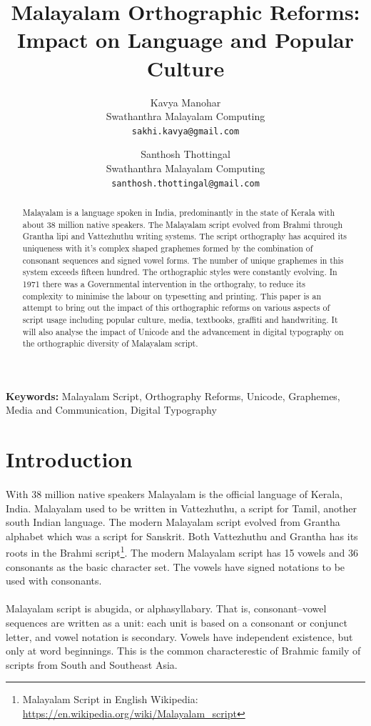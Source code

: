 \documentclass[10pt]{article}
\title{Malayalam Orthographic Reforms: \\Impact on Language and Popular Culture}
\author{Kavya Manohar \\
\small{Swathanthra Malayalam Computing} \\
 {\small {\tt sakhi.kavya@gmail.com}} \\
 \and
 Santhosh Thottingal \\
 \small{Swathanthra Malayalam Computing} \\
 {\small {\tt santhosh.thottingal@gmail.com}}}
\begin{document}
\maketitle

\begin{abstract}

Malayalam is a language spoken in India, predominantly in the state of Kerala with about 38 million native speakers. The Malayalam script evolved from Brahmi through Grantha lipi and Vattezhuthu writing systems. The script orthography has acquired its uniqueness with it's complex shaped graphemes formed by the combination of consonant sequences and signed vowel forms. The number of unique graphemes in this system exceeds fifteen hundred. The orthographic styles were constantly evolving. In 1971 there was a Governmental intervention in the orthograhy, to reduce its complexity to minimise the labour on typesetting and printing. This paper is an attempt to bring out the impact of this orthographic reforms on various aspects of script usage including popular culture, media, textbooks, graffiti and handwriting. It will also analyse the impact of Unicode and the advancement in digital typography on the orthographic diversity of Malayalam script.

\end{abstract}
 \textbf{Keywords:} Malayalam Script, Orthography Reforms, Unicode, Graphemes, Media and Communication, Digital Typography

\section{Introduction}

\paragraph{}
With 38 million native speakers Malayalam is the official language of Kerala, India. Malayalam used to be written in Vattezhuthu, a script for Tamil, another south Indian language. The modern Malayalam script evolved from Grantha alphabet which was a script for Sanskrit. Both Vattezhuthu and Grantha has its roots in the Brahmi script\footnote{Malayalam Script in English Wikipedia: \url{https://en.wikipedia.org/wiki/Malayalam_script}}. The modern Malayalam script has 15 vowels and 36 consonants as the basic character set. The vowels have signed notations to be used with consonants.

\paragraph{}
Malayalam script is abugida, or alphasyllabary. That is, consonant–vowel sequences are written as a unit: each unit is based on a consonant or conjunct letter, and vowel notation is secondary. Vowels have independent existence, but only at word beginnings. This is the common characterestic of Brahmic family of scripts from South and Southeast Asia.
\end{document}
